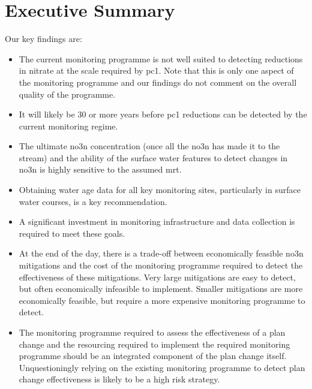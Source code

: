 
\section*{Executive Summary} \label{exsum} %

\begin{breakawaybox}[label={box:keyfind}, title=Key Findings]{}
    Our key findings are:
    \begin{itemize}
        \item The current monitoring programme is not well suited to detecting reductions in nitrate at the scale required by \gls{pc1}. Note that this is only one aspect of the monitoring programme and our findings do not comment on the overall quality of the programme.
        \item It will likely be 30 or more years before \gls{pc1} reductions can be detected by the current monitoring regime.
        \item The ultimate \gls{no3n} concentration (once all the \gls{no3n} has made it to the stream) and the ability of the surface water features to detect changes in \gls{no3n} is highly sensitive to the assumed \gls{mrt}.
        \item Obtaining water age data for all key monitoring sites, particularly in surface water courses, is a key recommendation.
        \item A significant investment in monitoring infrastructure and data collection is required to meet these goals.
        \item At the end of the day, there is a trade-off between economically feasible \gls{no3n} mitigations and the cost of the monitoring programme required to detect the effectiveness of these mitigations. Very large mitigations are easy to detect, but often economically infeasible to  implement. Smaller mitigations are more economically feasible, but require a more expensive monitoring programme to detect.
        \item The monitoring programme required to assess the effectiveness of a plan change and the resourcing required to implement the required monitoring programme should be an integrated component of the plan change itself. Unquestioningly relying on the existing monitoring programme to detect plan change effectiveness is likely to be a high risk strategy.
    \end{itemize}

\end{breakawaybox}

